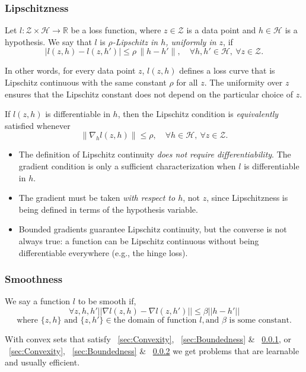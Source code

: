 \documentclass[11pt]{article}
\theoremstyle{plain}
\begin{document}
\subsubsection{Lipschitzness}\label{sec:Lipschitzness}
Let $l : \mathcal{Z} \times \mathcal{H} \to \mathbb{R}$ be a loss function, where $z \in \mathcal{Z}$ is a data point and $h \in \mathcal{H}$ is a hypothesis.  
We say that $l$ is \emph{$\rho$-Lipschitz in $h$, uniformly in $z$}, if  
\[
    |l(z,h) - l(z,h')| \leq \rho \, \|h - h'\|, 
    \quad \forall h,h' \in \mathcal{H}, \ \forall z \in \mathcal{Z}.
\]

In other words, for every data point $z$, $l(z,h)$ defines a loss curve that is Lipschitz continuous with the same constant $\rho$ for all $z$. 
The uniformity over $z$ ensures that the Lipschitz constant does not depend on the particular choice of $z$.

If $l(z,h)$ is differentiable in $h$, then the Lipschitz condition is \emph{equivalently} satisfied whenever
\[   
    \|\nabla_h l(z,h)\| \leq \rho, 
    \quad \forall h \in \mathcal{H}, \ \forall z \in \mathcal{Z}.
\]
\begin{itemize}
    \item The definition of Lipschitz continuity \emph{does not require differentiability}. 
          The gradient condition is only a sufficient characterization when $l$ is differentiable in $h$. 
    \item The gradient must be taken \emph{with respect to $h$}, not $z$, since Lipschitzness is being defined in terms of the hypothesis variable. 
    \item Bounded gradients guarantee Lipschitz continuity, but the converse is not always true: 
          a function can be Lipschitz continuous without being differentiable everywhere (e.g., the hinge loss). 
\end{itemize}

\subsubsection{Smoothness}\label{sec:Smoothness}
We say a function $l$ to be smooth if,
\[
\forall z,h,h' \lvert\lvert \nabla l(z,h) - \nabla l(z,h')\rvert\rvert \leq \beta\lvert\lvert h-h'\rvert\rvert 
\]
\[
\text{where } \{z,h\} \text{ and } \{z, h'\} \in \text{the domain of function }l, \text{and } \beta \text{ is some constant}.
\]

With convex sets that satisfy ~\ref{sec:Convexity}, ~\ref{sec:Boundedness} \& ~\ref{sec:Lipschitzness}, or  ~\ref{sec:Convexity}, ~\ref{sec:Boundedness} \& ~\ref{sec:Smoothness} we get problems that are learnable and usually efficient.
\end{document}
